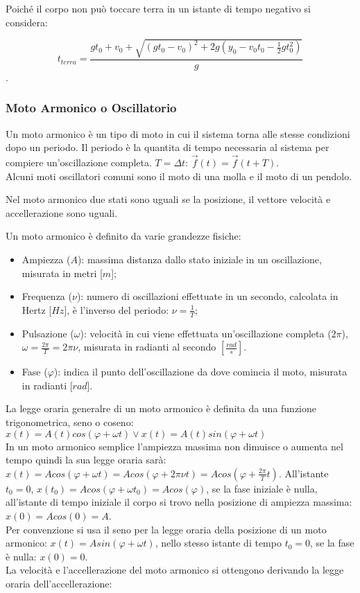 \documentclass{article}
\numberwithin{equation}{subsection}
\begin{document}
Poiché il corpo non può toccare terra in un istante di tempo 
negativo si considera:

\begin{equation}
    t_{terra} = \displaystyle\frac{gt_0+v_0 +\sqrt{(gt_0-v_0)^{2}+2g\left(y_0-v_0t_0-\displaystyle\frac{1}{2}gt_0^{2}\right)}}{g}
\end{equation}.

\subsubsection{Moto Armonico o Oscillatorio}
Un moto armonico è un tipo di moto in cui il sistema torna 
alle stesse condizioni dopo un periodo.
Il periodo è la quantita di tempo necessaria 
al sistema per compiere un'oscillazione completa.
$T = \Delta t$: $\vec{f}(t) = \vec{f}(t + T)$.\\

Alcuni moti oscillatori comuni sono il moto di una molla e il 
moto di un pendolo.

Nel moto armonico due stati sono uguali se la posizione, 
il vettore velocità e accellerazione sono uguali.

Un moto armonico è definito da varie grandezze fisiche:

\begin{itemize}
    \item Ampiezza ($A$): massima distanza dallo stato iniziale 
    in un oscillazione, misurata in metri [$m$];
    \item Frequenza ($\nu$): numero di oscillazioni effettuate 
    in un secondo, calcolata in Hertz [$Hz$], è l'inverso del 
    periodo: $\nu = \displaystyle\frac{1}{T}$;
    \item Pulsazione ($\omega$): velocità in cui viene 
    effettuata un'oscillazione completa ($2\pi$), $\omega = \displaystyle\frac{2\pi}{T} = 2\pi\nu$, 
    misurata in radianti al secondo $\left[\displaystyle\frac{rad}{s}\right]$.
    \item Fase ($\varphi$): indica il punto dell'oscillazione 
    da dove comincia il moto, misurata in radianti [$rad$].
\end{itemize}

La legge oraria generalre di un moto armonico è definita da 
una funzione trigonometrica, seno o coseno: $x(t) = A(t)cos(\varphi+\omega t) 
\lor x(t) = A(t)sin(\varphi+\omega t)$\\ 
In un moto armonico semplice l'ampiezza massima non dimuisce o 
aumenta nel tempo quindi la sua legge oraria sarà:  
$x(t) = Acos(\varphi + \omega t) =Acos(\varphi + 
2\pi\nu t) = Acos(\varphi + \displaystyle\frac{2\pi}{T}t)$.
All'istante $t_0 = 0$, $x(t_0) = Acos(\varphi + \omega t_0) = 
Acos(\varphi)$, se la fase iniziale è nulla, all'istante di 
tempo iniziale il corpo si trovo nella posizione 
di ampiezza massima: $x(0) = Acos(0) = A$.\\
Per convenzione si usa il seno per la legge oraria della posizione 
di un moto armonico: $x(t) = Asin(\varphi + \omega t)$, nello 
stesso istante di tempo $t_0 = 0$, se la fase è nulla: $x(0) = 0$.\\
La velocità e l'accellerazione del moto armonico si ottengono 
derivando la legge oraria dell'accellerazione:
\end{document}
